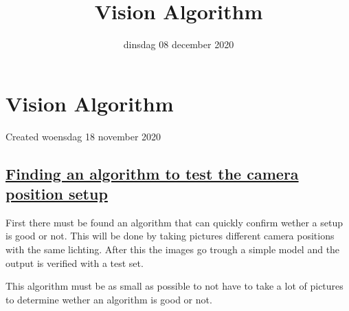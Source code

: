 \documentclass{scrartcl}
\title{Vision Algorithm}
\date{dinsdag 08 december 2020}
\author{}
\begin{document}
\maketitle

		\section{Vision Algorithm}

Created woensdag 18 november 2020



\subsection{\href{./Vision_Algorithm/camera_position_validation.txt}{Finding an algorithm to test the camera position setup}}

First there must be found an algorithm that can quickly confirm wether a setup is good or not. This will be done by taking pictures different camera positions with the same lichting. After this the images go trough a simple model and the output is verified with a test set. 

This algorithm must be as small as possible to not have to take a lot of pictures to determine wether an algorithm is good or not. 
\end{document}
